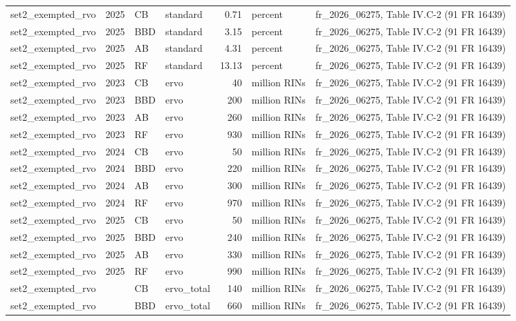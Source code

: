 \begin{longtable}{p{2.3cm}p{0.7cm}p{1.0cm}p{2.6cm}rp{1.7cm}p{4.6cm}}
set2\_exempted\_rvo & 2025 & CB & standard & 0.71 & percent & fr\_2026\_06275, Table IV.C-2 (91 FR 16439) \\
set2\_exempted\_rvo & 2025 & BBD & standard & 3.15 & percent & fr\_2026\_06275, Table IV.C-2 (91 FR 16439) \\
set2\_exempted\_rvo & 2025 & AB & standard & 4.31 & percent & fr\_2026\_06275, Table IV.C-2 (91 FR 16439) \\
set2\_exempted\_rvo & 2025 & RF & standard & 13.13 & percent & fr\_2026\_06275, Table IV.C-2 (91 FR 16439) \\
set2\_exempted\_rvo & 2023 & CB & ervo & 40 & million RINs & fr\_2026\_06275, Table IV.C-2 (91 FR 16439) \\
set2\_exempted\_rvo & 2023 & BBD & ervo & 200 & million RINs & fr\_2026\_06275, Table IV.C-2 (91 FR 16439) \\
set2\_exempted\_rvo & 2023 & AB & ervo & 260 & million RINs & fr\_2026\_06275, Table IV.C-2 (91 FR 16439) \\
set2\_exempted\_rvo & 2023 & RF & ervo & 930 & million RINs & fr\_2026\_06275, Table IV.C-2 (91 FR 16439) \\
set2\_exempted\_rvo & 2024 & CB & ervo & 50 & million RINs & fr\_2026\_06275, Table IV.C-2 (91 FR 16439) \\
set2\_exempted\_rvo & 2024 & BBD & ervo & 220 & million RINs & fr\_2026\_06275, Table IV.C-2 (91 FR 16439) \\
set2\_exempted\_rvo & 2024 & AB & ervo & 300 & million RINs & fr\_2026\_06275, Table IV.C-2 (91 FR 16439) \\
set2\_exempted\_rvo & 2024 & RF & ervo & 970 & million RINs & fr\_2026\_06275, Table IV.C-2 (91 FR 16439) \\
set2\_exempted\_rvo & 2025 & CB & ervo & 50 & million RINs & fr\_2026\_06275, Table IV.C-2 (91 FR 16439) \\
set2\_exempted\_rvo & 2025 & BBD & ervo & 240 & million RINs & fr\_2026\_06275, Table IV.C-2 (91 FR 16439) \\
set2\_exempted\_rvo & 2025 & AB & ervo & 330 & million RINs & fr\_2026\_06275, Table IV.C-2 (91 FR 16439) \\
set2\_exempted\_rvo & 2025 & RF & ervo & 990 & million RINs & fr\_2026\_06275, Table IV.C-2 (91 FR 16439) \\
set2\_exempted\_rvo &  & CB & ervo\_total & 140 & million RINs & fr\_2026\_06275, Table IV.C-2 (91 FR 16439) \\
set2\_exempted\_rvo &  & BBD & ervo\_total & 660 & million RINs & fr\_2026\_06275, Table IV.C-2 (91 FR 16439) \\

\end{longtable}
